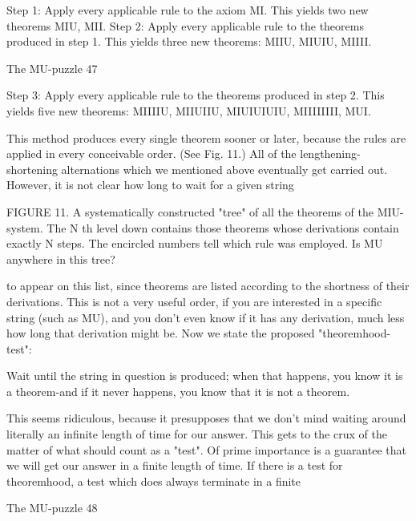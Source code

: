       Step 1: Apply every applicable rule to the axiom MI. This yields two new theorems
            MIU, MII.
      Step 2: Apply every applicable rule to the theorems produced in step 1. This yields
            three new theorems: MIIU, MIUIU, MIIII.




The MU-puzzle                                                                             47

      Step 3: Apply every applicable rule to the theorems produced in step 2. This yields
      five new theorems: MIIIIU, MIIUIIU, MIUIUIUIU, MIIIIIIII, MUI.


This method produces every single theorem sooner or later, because the rules are applied
in every conceivable order. (See Fig. 11.) All of the lengthening-shortening alternations
which we mentioned above eventually get carried out. However, it is not clear how long
to wait for a given string




FIGURE 11. A systematically constructed "tree" of all the theorems of the MIU-system.
The N th level down contains those theorems whose derivations contain exactly N steps.
The encircled numbers tell which rule was employed. Is MU anywhere in this tree?


to appear on this list, since theorems are listed according to the shortness of their
derivations. This is not a very useful order, if you are interested in a specific string (such
as MU), and you don't even know if it has any derivation, much less how long that
derivation might be.
        Now we state the proposed "theoremhood-test":

      Wait until the string in question is produced; when that happens, you know it
      is a theorem-and if it never happens, you know that it is not a theorem.

This seems ridiculous, because it presupposes that we don't mind waiting around literally
an infinite length of time for our answer. This gets to the crux of the matter of what
should count as a "test". Of prime importance is a guarantee that we will get our answer
in a finite length of time. If there is a test for theoremhood, a test which does always
terminate in a finite




The MU-puzzle                                                                              48

